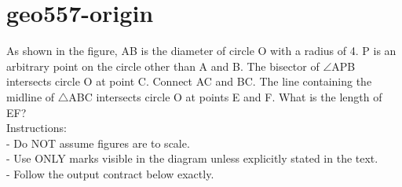 \documentclass[12pt]{article}
\begin{document}
\section*{geo557-origin}
\noindent\begin{minipage}{\textwidth}
\setlength{\parskip}{4pt}
As shown in the figure, AB is the diameter of circle O with a radius of 4. P is an arbitrary point on the circle other than A and B. The bisector of \ensuremath{\angle }APB intersects circle O at point C. Connect AC and BC. The line containing the midline of \ensuremath{\triangle }ABC intersects circle O at points E and F. What is the length of EF?\\
Instructions:\\
- Do NOT assume figures are to scale.\\
- Use ONLY marks visible in the diagram unless explicitly stated in the text.\\
- Follow the output contract below exactly.\\
\end{minipage}
\end{document}
